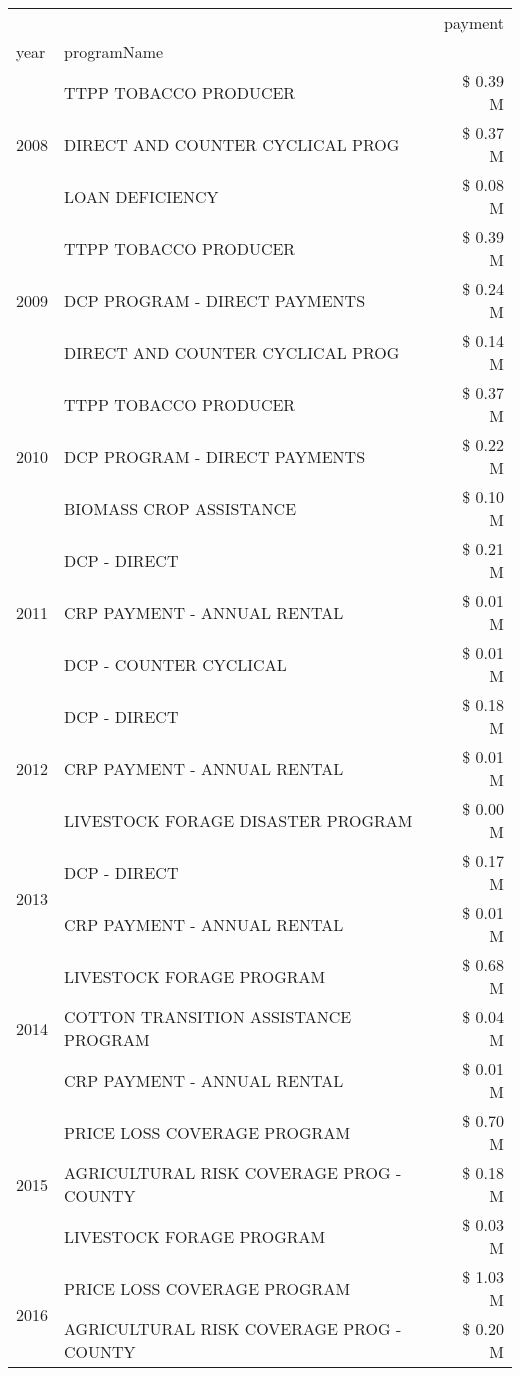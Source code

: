 \begin{tabular}{llr}
\toprule
 &  & payment \\
year & programName &  \\
\midrule
\multirow[t]{3}{*}{2008} & TTPP TOBACCO PRODUCER & \$ 0.39 M \\
 & DIRECT AND COUNTER CYCLICAL PROG & \$ 0.37 M \\
 & LOAN DEFICIENCY & \$ 0.08 M \\
\cline{1-3}
\multirow[t]{3}{*}{2009} & TTPP TOBACCO PRODUCER & \$ 0.39 M \\
 & DCP PROGRAM - DIRECT PAYMENTS & \$ 0.24 M \\
 & DIRECT AND COUNTER CYCLICAL PROG & \$ 0.14 M \\
\cline{1-3}
\multirow[t]{3}{*}{2010} & TTPP TOBACCO PRODUCER & \$ 0.37 M \\
 & DCP PROGRAM - DIRECT PAYMENTS & \$ 0.22 M \\
 & BIOMASS CROP ASSISTANCE & \$ 0.10 M \\
\cline{1-3}
\multirow[t]{3}{*}{2011} & DCP - DIRECT & \$ 0.21 M \\
 & CRP PAYMENT - ANNUAL RENTAL & \$ 0.01 M \\
 & DCP - COUNTER CYCLICAL & \$ 0.01 M \\
\cline{1-3}
\multirow[t]{3}{*}{2012} & DCP - DIRECT & \$ 0.18 M \\
 & CRP PAYMENT - ANNUAL RENTAL & \$ 0.01 M \\
 & LIVESTOCK FORAGE DISASTER PROGRAM & \$ 0.00 M \\
\cline{1-3}
\multirow[t]{2}{*}{2013} & DCP - DIRECT & \$ 0.17 M \\
 & CRP PAYMENT - ANNUAL RENTAL & \$ 0.01 M \\
\cline{1-3}
\multirow[t]{3}{*}{2014} & LIVESTOCK FORAGE PROGRAM & \$ 0.68 M \\
 & COTTON TRANSITION ASSISTANCE PROGRAM & \$ 0.04 M \\
 & CRP PAYMENT - ANNUAL RENTAL & \$ 0.01 M \\
\cline{1-3}
\multirow[t]{3}{*}{2015} & PRICE LOSS COVERAGE PROGRAM & \$ 0.70 M \\
 & AGRICULTURAL RISK COVERAGE PROG - COUNTY & \$ 0.18 M \\
 & LIVESTOCK FORAGE PROGRAM & \$ 0.03 M \\
\cline{1-3}
\multirow[t]{3}{*}{2016} & PRICE LOSS COVERAGE PROGRAM                   & \$ 1.03 M \\
 & AGRICULTURAL RISK COVERAGE PROG - COUNTY      & \$ 0.20 M \\

\end{tabular}
